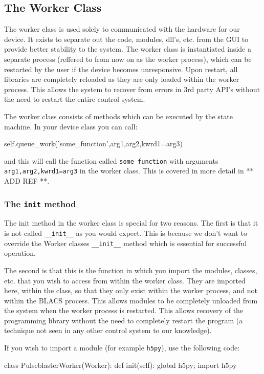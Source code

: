 \documentclass[12pt]{article}
\begin{document}
\subsection{The Worker Class}
The worker class is used solely to communicated with the hardware for our device. It exists to separate out the code, modules, dll's, etc. from the GUI to provide better stability to the system. The worker class is instantiated inside a separate process (reffered to from now on as the worker process), which can be restarted by the user if the device becomes unresponsive. Upon restart, all libraries are completely reloaded as they are only loaded within the worker process. This allows the system to recover from errors in 3rd party API's without the need to restart the entire control system.

The worker class consists of methods which can be executed by the state machine. In your device class you can call:
\begin{python}
self.queue_work('some_function',arg1,arg2,kwrd1=arg3)
\end{python}
and this will call the function called \texttt{some\_function} with arguments \texttt{arg1,arg2,kwrd1=arg3} in the worker class. This is covered in more detail in ** ADD REF **.


\subsubsection{The \texttt{init} method}
The init method in the worker class is special for two reasons. The first is that it is not called \texttt{\_\_init\_\_} as you would expect. This is because we don't want to override the Worker classes \texttt{\_\_init\_\_} method which is essential for successful operation.

The second is that this is the function in which you import the modules, classes, etc. that you wish to access from within the worker class. They are imported here, within the class, so that they only exist within the worker process, and not within the BLACS process. This allows modules to be completely unloaded from the system when the worker process is restarted. This allows recovery of the programming library without the need to completely restart the program (a technique not seen in any other control system to our knowledge).

If you wish to import a module (for example \texttt{h5py}), use the following code:
\begin{python}
class PulseblasterWorker(Worker):
    def init(self):
        global h5py; import h5py
\end{python}
\end{document}

